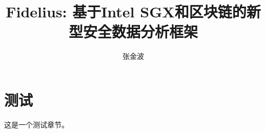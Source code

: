 \documentclass{article}
\begin{document}
\title{Fidelius: 基于Intel SGX和区块链的新型安全数据分析框架}

\author{张金波}

\maketitle

\section{测试}

这是一个测试章节。
\end{document}
